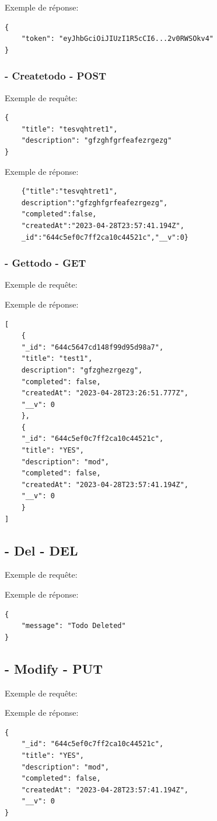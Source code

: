 \documentclass[a4paper,12pt]{report}
\begin{document}
Exemple de réponse:
\begin{lstlisting}
{
	"token": "eyJhbGciOiJIUzI1R5cCI6...2v0RWSOkv4"
}
\end{lstlisting}
\subsubsection{- Createtodo - POST}
Exemple de requête:
\begin{lstlisting}
{
	"title": "tesvqhtret1",
	"description": "gfzghfgrfeafezrgezg"
}
\end{lstlisting}

Exemple de réponse:
\begin{lstlisting}
	{"title":"tesvqhtret1",
	description":"gfzghfgrfeafezrgezg",
	"completed":false,
	"createdAt":"2023-04-28T23:57:41.194Z",
	_id":"644c5ef0c7ff2ca10c44521c","__v":0}
\end{lstlisting}

\subsubsection{- Gettodo - GET}
Exemple de requête:


Exemple de réponse:
\begin{lstlisting}
[
	{
	"_id": "644c5647cd148f99d95d98a7",
	"title": "test1",
	description": "gfzghezrgezg",
	"completed": false,
	"createdAt": "2023-04-28T23:26:51.777Z",
	"__v": 0
	},
	{
	"_id": "644c5ef0c7ff2ca10c44521c",
	"title": "YES",
	"description": "mod",
	"completed": false,
	"createdAt": "2023-04-28T23:57:41.194Z",
	"__v": 0
	}
]
\end{lstlisting}

\subsection{- Del - DEL}
Exemple de requête:

Exemple de réponse:
\begin{lstlisting}
{
	"message": "Todo Deleted"
}
\end{lstlisting}

\subsection{- Modify - PUT}
Exemple de requête:

Exemple de réponse:
\begin{lstlisting}
{
	"_id": "644c5ef0c7ff2ca10c44521c",
	"title": "YES",
	"description": "mod",
	"completed": false,
	"createdAt": "2023-04-28T23:57:41.194Z",
	"__v": 0
}
\end{lstlisting}
\end{document}
